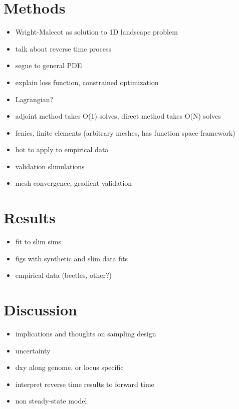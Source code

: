 \documentclass{article}
\begin{document}
	\section{Methods}
	\begin{itemize}
		\item Wright-Malecot as solution to 1D landscape problem
		\item talk about reverse time process
		\item segue to general PDE
		\item explain loss function, constrained optimization
		\item Lagrangian?
		\item adjoint method takes O(1) solves, direct method takes O(N) solves
		\item fenics, finite elements (arbitrary meshes, has function space framework)
		\item hot to apply to empirical data
		\item validation slimulations
		\item mesh convergence, gradient validation
	\end{itemize}

	\section{Results}
	\begin{itemize}
		\item fit to slim sims 
		\item figs with synthetic and slim data fits
		\item empirical data (beetles, other?)
	\end{itemize}
	
	\section{Discussion}
	\begin{itemize}
		\item implications and thoughts on sampling design
		\item uncertainty
		\item dxy along genome, or locus specific
		\item interpret reverse time results to forward time
		\item non steady-state model
	\end{itemize}
	
	
\end{document}
